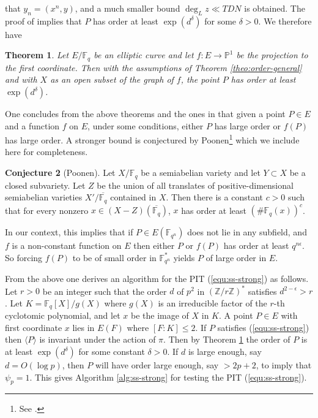 \documentclass[12pt]{article}
\theoremstyle{plain}
\newtheorem{theorem}{Theorem}
\theoremstyle{definition}
\newtheorem{conjecture}[theorem]{Conjecture}
\newcommand{\ang}[1]{\langle#1\rangle}
\def\Z{\ensuremath{\mathbb{Z}}}
\def\F{\ensuremath{\mathbb{F}}}
\begin{document}
that $y_n = (x^n, y)$, and a much smaller bound $\deg_L z \ll TDN$ is obtained. The proof of 
\cite[Theorem 1.1]{voloch2010} implies that $P$ has order at least $\exp(d^\delta)$ for some 
$\delta > 0$. We therefore have
\begin{theorem}
	\label{theo:order-ell}
	Let $E/\F_q$ be an elliptic curve and let $f: E \rightarrow \mathbb{P}^1$ be the projection to 
	the first coordinate. Then with the assumptions of Theorem \ref{theo:order-general} and with 
	$X$ as an open subset of the graph of $f$, the point $P$ has order at least $\exp(d^\delta)$.
\end{theorem}
One concludes from the above theorems and the ones in \cite{voloch2010} that given a point $P \in 
E$ and a function $f$ on $E$, under some conditions, either $P$ has large order or $f(P)$ has large 
order. A stronger bound is conjectured by Poonen\footnote{See \cite{voloch2007}.} which we include 
here for completeness.
\begin{conjecture}[Poonen]
	\label{conj:poonen}
	Let $X/\F_q$ be a semiabelian variety and let $Y \subset X$ be a closed subvariety. Let $Z$ be 
	the union of all translates of positive-dimensional semiabelian varieties $X'/\overline{\F_q}$ 
	contained in $X$. Then there is a constant $c > 0$ such that for every nonzero $x \in (X - Z) 
	(\overline{\F_q})$, $x$ has order at least $(\#\F_q(x))^c$.
\end{conjecture}
In our context, this implies that if $P \in E(\F_{q^n})$ does not lie in any subfield, and $f$ is a 
non-constant function on $E$ then either $P$ or $f(P)$ has order at least $q^{n\epsilon}$. So 
forcing $f(P)$ to be of small order in $\F_{q^n}^*$ yields $P$ of large order in $E$.

From the above one derives an algorithm for the PIT (\ref{equ:ss-strong}) as follows. Let $r > 0$ 
be an integer such that the order $d$ of $p^2$ in $(\Z/r\Z)^*$ satisfies $d^{2 - \epsilon} > r$. 
Let $K = \F_q[X]/g(X)$ where $g(X)$ is an irreducible factor of the  $r$-th cyclotomic 
polynomial, and let $x$ be the image of $X$ in $K$. A point $P \in E$ with first coordinate $x$ 
lies in $E(F)$ where $[F : K] \le 2$. If $P$ satisfies (\ref{equ:ss-strong}) then $\ang{P}$ is 
invariant under the action of $\pi$. Then by Theorem \ref{theo:order-ell} the order of $P$ is at 
least $\exp(d^\delta)$ for some constant $\delta > 0$. If $d$ is large enough, say $d = O(\log p)$, 
then $P$ will have order large enough, say $> 2p + 2$, to imply that $\psi_p = 1$. This gives 
Algorithm \ref{alg:ss-strong} for testing the PIT (\ref{equ:ss-strong}).
\end{document}
